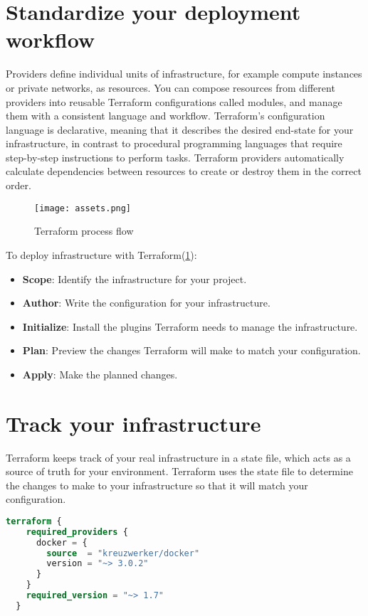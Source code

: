 \documentclass[../main.tex]{subfiles}
\begin{document}
\section{Standardize your deployment workflow}
Providers define individual units of infrastructure, for example compute instances or private networks, as resources.
You can compose resources from different providers into reusable Terraform configurations called modules, and manage them with a consistent language and workflow.
Terraform's configuration language is declarative, meaning that it describes the desired end-state for your infrastructure, in contrast to procedural programming languages that require step-by-step instructions to perform tasks.
Terraform providers automatically calculate dependencies between resources to create or destroy them in the correct order.
\begin{figure}[!ht]
  \centerline{\texttt{[image: assets.png]}}
  \caption{Terraform process flow}
  \label{img:Terraform process flow}
\end{figure}

To deploy infrastructure with Terraform(\ref{img:Terraform process flow}):
\begin{itemize}
  \item {\textbf{Scope}: Identify the infrastructure for your project.}
  \item {\textbf{Author}: Write the configuration for your infrastructure.}
  \item {\textbf{Initialize}: Install the plugins Terraform needs to manage the infrastructure.}
  \item {\textbf{Plan}: Preview the changes Terraform will make to match your configuration.}
  \item {\textbf{Apply}: Make the planned changes.}
\end{itemize}
\section{Track your infrastructure}
Terraform keeps track of your real infrastructure in a state file, which acts as a source of truth for your environment.
Terraform uses the state file to determine the changes to make to your infrastructure so that it will match your configuration.

\begin{lstlisting}[caption=terraform.tf,language=Terraform]
  terraform {
    required_providers {
      docker = {
        source  = "kreuzwerker/docker"
        version = "~> 3.0.2"
      }
    }
    required_version = "~> 1.7"
  }
\end{lstlisting}
\end{document}
